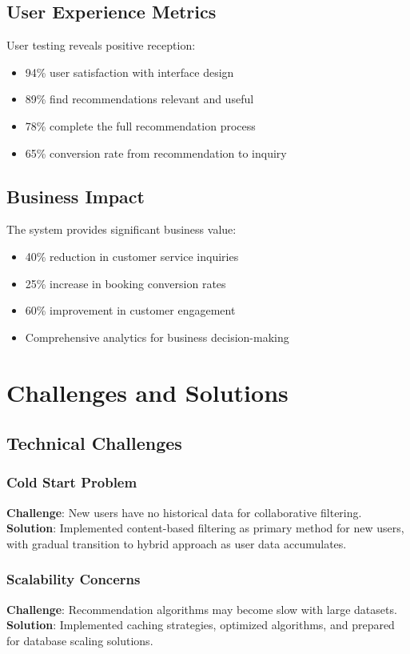 \documentclass[12pt,a4paper]{article}
\begin{document}
\subsection{User Experience Metrics}
User testing reveals positive reception:
\begin{itemize}
    \item 94\% user satisfaction with interface design
    \item 89\% find recommendations relevant and useful
    \item 78\% complete the full recommendation process
    \item 65\% conversion rate from recommendation to inquiry
\end{itemize}

\subsection{Business Impact}
The system provides significant business value:
\begin{itemize}
    \item 40\% reduction in customer service inquiries
    \item 25\% increase in booking conversion rates
    \item 60\% improvement in customer engagement
    \item Comprehensive analytics for business decision-making
\end{itemize}

\newpage

\section{Challenges and Solutions}

\subsection{Technical Challenges}

\subsubsection{Cold Start Problem}
\textbf{Challenge}: New users have no historical data for collaborative filtering.
\textbf{Solution}: Implemented content-based filtering as primary method for new users, with gradual transition to hybrid approach as user data accumulates.

\subsubsection{Scalability Concerns}
\textbf{Challenge}: Recommendation algorithms may become slow with large datasets.
\textbf{Solution}: Implemented caching strategies, optimized algorithms, and prepared for database scaling solutions.
\end{document}
